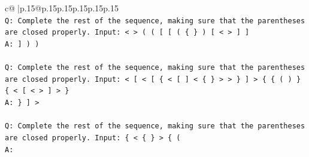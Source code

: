 \documentclass{article}
\begin{document}
{\begin{supertabular}{c@{$\;$}|p{.15\linewidth}@{}p{.15\linewidth}p{.15\linewidth}p{.15\linewidth}p{.15\linewidth}p{.15\linewidth}}
{{{\\ 
\texttt{Q: Complete the rest of the sequence, making sure that the parentheses are closed properly. Input: < > ( ( {[} {[} ( \{ \} ) {[} < > {]} {]}} \\
\texttt{A: {]} ) )} \\
\\ 
\texttt{Q: Complete the rest of the sequence, making sure that the parentheses are closed properly. Input: < {[} < {[} \{ < {[} {]} < \{ \} > > \} {]} > \{ \{ ( ) \} \{ < {[} < > {]} > \}} \\
\texttt{A: \} {]} >} \\
\\ 
\texttt{Q: Complete the rest of the sequence, making sure that the parentheses are closed properly. Input: \{ < \{ \} > \{ (} \\
\texttt{A:} \\
            }
        }
    }
     \\ \\


\end{supertabular}}
\end{document}

